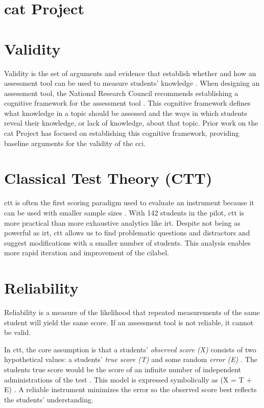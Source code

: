 \iflong

\section{\gls{cat} Project}


\fi

\section{Validity}

Validity is the set of arguments and evidence that establish whether and how an assessment tool can be used to measure students' knowledge \cite{douglas_purzer}. When designing an assessment tool, the National Research Council recommends establishing a cognitive framework for the assessment tool \cite{knowing_what_students_know}. This cognitive framework defines what knowledge in a topic should be assessed and the ways in which students reveal their knowledge, or lack of knowledge, about that topic. Prior work on the \gls{cat} Project has focused on establishing this cognitive framework, providing baseline arguments for the validity of the \gls{cci}.



\section{Classical Test Theory (CTT)}


\gls{ctt} is often the first scoring paradigm used to evaluate an instrument because it can be used with smaller sample sizes \cite{og_ctt}. With 142 students in the pilot, \gls{ctt} is more practical than more exhaustive analytics like \gls{irt}. Despite not being as powerful as \gls{irt}, \gls{ctt} allows us to find problematic questions and distractors and suggest modifications with a smaller number of students. This analysis enables more rapid iteration and improvement of the \gls{cilabel}.

\section{Reliability}


Reliability is a measure of the likelihood that repeated measurements of the same student will yield the same score. If an assessment tool is not reliable, it cannot be valid.

In \gls{ctt}, the core assumption is that a students' \textit{observed score (X)} consists of two hypothetical values: a students' \textit{true score (T)} and some random \textit{error (E)} \cite{og_ctt}. The students true score would be the score of an infinite number of independent administrations of the test \cite{true_score}.  This model is expressed symbolically as (X = T + E) \cite{dlci}. A reliable instrument minimizes the error so the observed score best reflects the students' understanding. 

